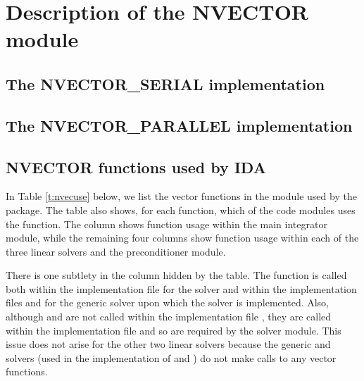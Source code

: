 \chapter{Description of the NVECTOR module}\label{s:nvector}


\section{The NVECTOR\_SERIAL implementation}\label{ss:nvec_ser}


\section{The NVECTOR\_PARALLEL implementation}\label{ss:nvec_par}


\section{NVECTOR functions used by IDA}

In Table \ref{t:nvecuse} below, we list the vector functions in the 
{\nvector} module used by the {\ida} package.
The table also shows, for each function, which of the code modules uses
the function. The {\ida} column shows function usage within the main
integrator module, while the remaining four columns show function usage
within each of the three {\ida} linear solvers and the {\idabbdpre}
preconditioner module. 

There is one subtlety in the {\idaspgmr} column hidden by the table. 
The  function is called both within the 
implementation file  for the {\idaspgmr} solver and within
the implementation files  and  for the generic
{\spgmr} solver upon which the {\idaspgmr} solver is implemented. Also, although
 and  are not called within the implementation file
, they are called within the implementation file
 and so are required by the {\idaspgmr} solver module.
This issue does not arise for the other two {\ida} linear solvers because
the generic {\dense} and {\band} solvers (used in the implementation of
{\idadense} and {\idaband}) do not make calls to any vector functions.

